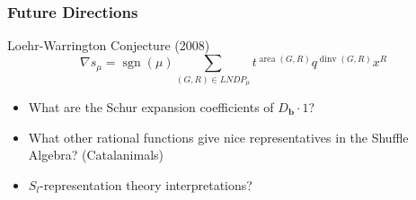 \documentclass{beamer}
\DeclareMathOperator{\area}{area}
\DeclareMathOperator{\dinv}{dinv}
\newcommand{\bb}{{\mathbf b}}
\DeclareMathOperator{\sgn}{sgn}
\newcounter{c}
\begin{document}
\begin{frame}
  \frametitle{Future Directions}
  \begin{block}{Loehr-Warrington Conjecture (2008)}
    \[\nabla s_\mu = \sgn(\mu)\sum_{(G,R)
        \in LNDP_\mu} t^{\area(G,R)} q^{\dinv(G,R)} x^R\]
  \end{block}\pause
  \begin{itemize}
  \item What are the Schur expansion coefficients of \(D_\bb \cdot 1\)?\pause
  \item What other rational functions give nice representatives in the
    Shuffle Algebra? (Catalanimals)\pause
  \item \(S_l\)-representation theory interpretations?
  \end{itemize}
\end{frame}
\end{document}
